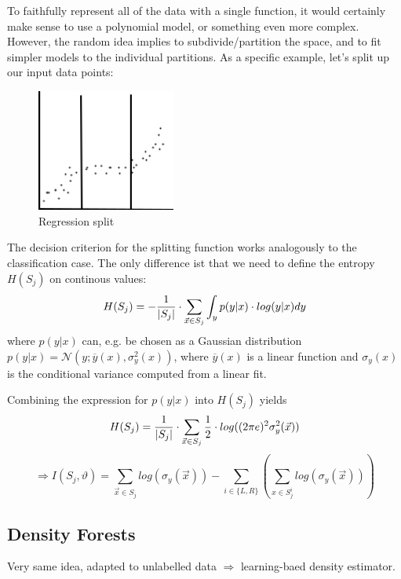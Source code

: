\documentclass{scrartcl}
\DeclarePairedDelimiter\abs{\lvert}{\rvert}%
\begin{document}
To faithfully represent all of the data with a single function, it would certainly make sense to use a polynomial model, or something even more complex. However, the random idea implies to subdivide/partition the space, and to fit simpler models to the individual partitions. As a specific example, let's split up our input data points:

\begin{figure}[ht]
	\centering
    \includegraphics[height=4cm]{img/rf_regression.jpg}
	\caption{Regression split}
	\label{fig:rf_regression}
\end{figure}

The decision criterion for the splitting function works analogously to the classification case. The only difference ist that we need to define the entropy \(H(S_j)\) on continous values:
\[H(S_j) = -\frac{1}{\abs{S_j}} \cdot \sum_{\vec{x} \in S_j} \int_y p(y|x) \cdot log(y|x)dy\]
where \(p(y|x)\) can, e.g. be chosen as a Gaussian distribution \(p(y|x) = \mathcal{N}(y; \overline{y}(x), \sigma_y^2(x))\), where \(\overline{y}(x)\) is a linear function and \(\sigma_y(x)\) is the conditional variance computed from a linear fit.


Combining the expression for \(p(y|x)\) into \(H(S_j)\) yields
\[H(S_j) = \frac{1}{\abs{S_j}} \cdot \sum_{\vec{x} \in S_j} \frac{1}{2} \cdot log((2 \pi e)^2 \sigma_y^2(\vec{x}))\]
\[\Rightarrow I(S_j, \vartheta) = \sum_{\vec{x} \in S_j} log(\sigma_y(\vec{x})) - \sum_{i \in \{L, R\}} (\sum_{x \in S_j^i} log (\sigma_y(\vec{x}))) \]

\subsection{Density Forests}
Very same idea, adapted to unlabelled data $\Rightarrow$ learning-baed density estimator.
\end{document}
